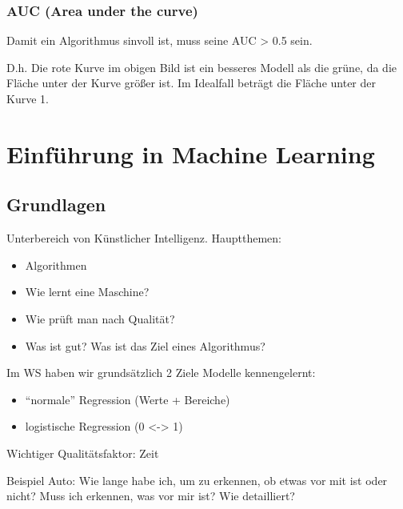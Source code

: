 \documentclass[
]{article}
\providecommand{\tightlist}{%
  \setlength{\itemsep}{0pt}\setlength{\parskip}{0pt}}
\begin{document}
\hypertarget{auc-area-under-the-curve}{%
\subsubsection{AUC (Area under the
curve)}\label{auc-area-under-the-curve}}

Damit ein Algorithmus sinvoll ist, muss seine AUC \textgreater{} 0.5
sein.

D.h. Die rote Kurve im obigen Bild ist ein besseres Modell als die
grüne, da die Fläche unter der Kurve größer ist. Im Idealfall beträgt
die Fläche unter der Kurve 1.\clearpage

\hypertarget{einfuxfchrung-in-machine-learning}{%
\section{Einführung in Machine
Learning}\label{einfuxfchrung-in-machine-learning}}

\hypertarget{grundlagen}{%
\subsection{Grundlagen}\label{grundlagen}}

Unterbereich von Künstlicher Intelligenz. Hauptthemen:

\begin{itemize}
\tightlist
\item
  Algorithmen\\
\item
  Wie lernt eine Maschine?\\
\item
  Wie prüft man nach Qualität?\\
\item
  Was ist gut? Was ist das Ziel eines Algorithmus?
\end{itemize}

Im WS haben wir grundsätzlich 2 Ziele Modelle kennengelernt:

\begin{itemize}
\tightlist
\item
  ``normale'' Regression (Werte + Bereiche)\\
\item
  logistische Regression (0 \textless-\textgreater{} 1)
\end{itemize}

Wichtiger Qualitätsfaktor: Zeit

Beispiel Auto: Wie lange habe ich, um zu erkennen, ob etwas vor mit ist
oder nicht? Muss ich erkennen, was vor mir ist? Wie detailliert?
\end{document}
